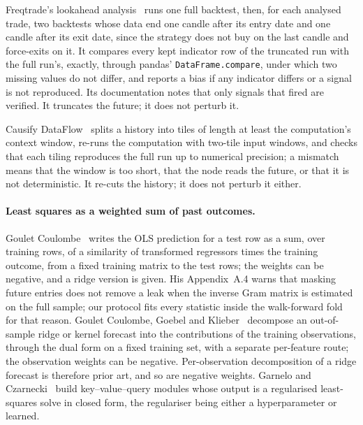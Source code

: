 \documentclass[11pt]{article}
\newcommand{\code}[1]{\texttt{#1}}
\begin{document}
Freqtrade's lookahead analysis~\cite{freqtrade} %
runs one full backtest, then, for each analysed trade, two backtests whose data end one candle
after its entry date and one candle after its exit date, since the strategy does not buy on the
last candle and force-exits on it. It compares every kept
indicator row of the truncated run with the full run's, exactly, through pandas'
\code{DataFrame.compare}, under which two missing values do not differ, and reports a bias if any indicator differs or a signal is not reproduced. Its
documentation notes that only signals that fired are verified. It truncates the future; it does
not perturb it.

Causify DataFlow~\cite{causify2025} %
splits a history into tiles of length at least the computation's context window, re-runs the
computation with two-tile input windows, and checks that each tiling reproduces the full run up to
numerical precision; a mismatch means that the window is too short, that the node reads the
future, or that it is not deterministic. It re-cuts the history; it does not perturb it either.

\paragraph{Least squares as a weighted sum of past outcomes.}
Goulet Coulombe~\cite{gouletcoulombe2025ols} %
writes the OLS prediction for a test row as a sum, over training rows, of a similarity of
transformed regressors times the training outcome, from a fixed training matrix to the test rows; the weights can be negative, and a ridge version is
given. His Appendix~A.4 warns that masking future entries does not remove a leak when the inverse
Gram matrix is estimated on the full sample; our protocol fits every statistic inside the
walk-forward fold for that reason. Goulet Coulombe, Goebel and Klieber~\cite{gouletcoulombe2024dual}
decompose an out-of-sample ridge or kernel forecast into the contributions of the training
observations, through the dual form on a fixed training set, with a separate per-feature route;
the observation weights can be negative. Per-observation decomposition of a ridge forecast is
therefore prior art, and so are negative weights. Garnelo and Czarnecki~\cite{garnelo2023}
build key--value--query modules whose output is a regularised least-squares solve in closed form,
the regulariser being either a hyperparameter or learned.
\end{document}
